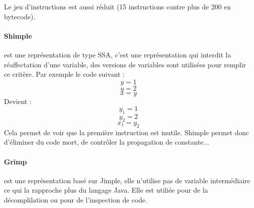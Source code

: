 	Le jeu d'instructions est aussi réduit (15 instructions contre plus de 
200 en bytecode).
	\paragraph{Shimple} est une représentation de type \gls{SSA}, c'est une 
représentation qui interdit la réaffectation d'une variable, des versions de 
variables sont utilisées pour remplir ce critère. Par exemple le code suivant :
	$$ y = 1 $$
	$$ y = 2 $$
	$$ x = y $$
	Devient :
	$$ y_1 = 1 $$
	$$ y_2 = 2 $$
	$$ x_1 = y_2 $$ 
	Cela permet de voir que la première instruction est inutile. Shimple 
permet donc d'éliminer du code mort, de contrôler la propagation de constante...

	\paragraph{Grimp} est une représentation basé sur Jimple, elle 
n'utilise pas de variable intermédiaire ce qui la rapproche plus du langage 
Java. Elle est utiliée pour de la décomplilation ou pour de l'inspection de 
code.

\section{}

\paragraph{}